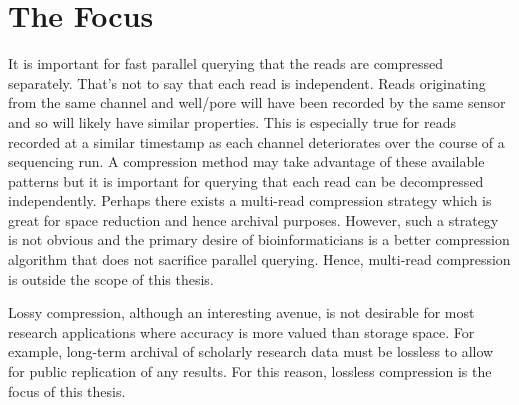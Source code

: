 \section{The Focus}


It is important for fast parallel querying that the reads are compressed separately. That's not to say that each read is independent. Reads originating from the same channel and well/pore will have been recorded by the same sensor and so will likely have similar properties. This is especially true for reads recorded at a similar timestamp as each channel deteriorates over the course of a sequencing run. A compression method may take advantage of these available patterns but it is important for querying that each read can be decompressed independently. Perhaps there exists a multi-read compression strategy which is great for space reduction and hence archival purposes. However, such a strategy is not obvious and the primary desire of bioinformaticians is a better compression algorithm that does not sacrifice parallel querying. Hence, multi-read compression is outside the scope of this thesis.

Lossy compression, although an interesting avenue, is not desirable for most research applications where accuracy is more valued than storage space. For example, long-term archival of scholarly research data must be lossless to allow for public replication of any results. For this reason, lossless compression is the focus of this thesis.
